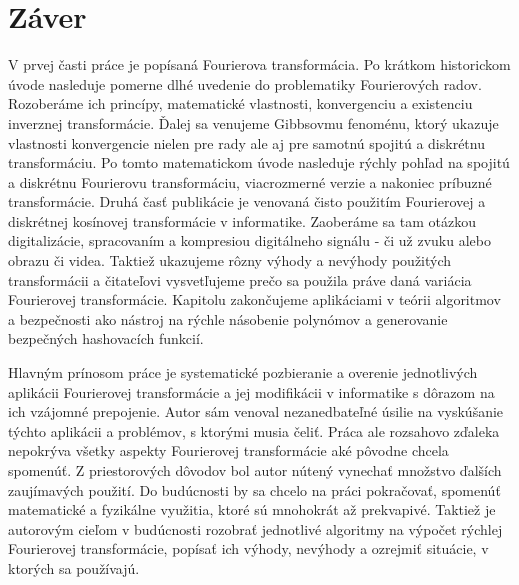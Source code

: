 \chapter{Záver}

V prvej časti práce je popísaná Fourierova transformácia. Po krátkom
historickom úvode nasleduje pomerne dlhé uvedenie do problematiky
Fourierových radov. Rozoberáme ich princípy, matematické vlastnosti,
konvergenciu a existenciu inverznej transformácie. Ďalej sa venujeme
Gibbsovmu fenoménu, ktorý ukazuje vlastnosti konvergencie nielen pre
rady ale aj pre samotnú spojitú a diskrétnu transformáciu. Po tomto
matematickom úvode nasleduje rýchly pohľad na spojitú a diskrétnu
Fourierovu transformáciu, viacrozmerné verzie a nakoniec príbuzné
transformácie.
Druhá časť publikácie je venovaná čisto použitím Fourierovej a
diskrétnej kosínovej transformácie v informatike. Zaoberáme sa tam
otázkou digitalizácie, spracovaním a kompresiou digitálneho signálu -
či už zvuku alebo obrazu či videa. Taktiež ukazujeme rôzny výhody a
nevýhody použitých transformácii a čitateľovi vysvetľujeme prečo sa
použila práve daná variácia Fourierovej transformácie. Kapitolu
zakončujeme aplikáciami v teórii algoritmov a bezpečnosti ako nástroj
na rýchle násobenie polynómov a generovanie bezpečných hashovacích
funkcií.

Hlavným prínosom práce je systematické pozbieranie a overenie jednotlivých
aplikácii Fourierovej transformácie a jej modifikácii v informatike s
dôrazom na ich vzájomné prepojenie. Autor sám venoval nezanedbateľné
úsilie na vyskúšanie týchto aplikácii a problémov, s ktorými musia
čeliť. Práca ale rozsahovo zďaleka
nepokrýva všetky aspekty Fourierovej transformácie aké pôvodne chcela
spomenúť. Z priestorových dôvodov bol autor nútený
vynechať množstvo ďalších zaujímavých použití. Do budúcnosti by sa
chcelo na práci pokračovať, spomenúť matematické a fyzikálne využitia,
ktoré sú mnohokrát až prekvapivé. Taktiež je autorovým cieľom v
budúcnosti rozobrať jednotlivé algoritmy na výpočet rýchlej Fourierovej transformácie,
popísať ich výhody, nevýhody a ozrejmiť situácie, v ktorých sa
používajú.
